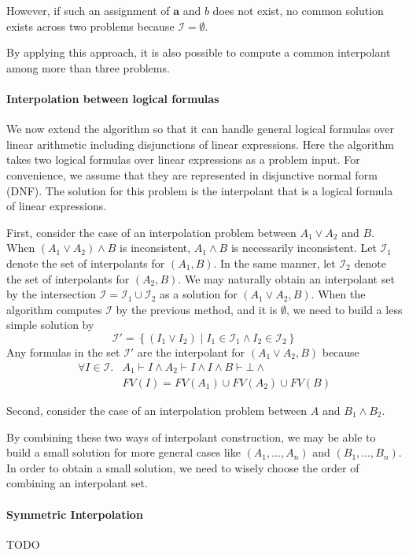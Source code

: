 However, if such an assignment of $\mathbf{a}$ and $b$ does not exist,
no common solution exists across two problems because $\mathcal{I} =
\emptyset$.

By applying this approach, it is also possible to compute a common
interpolant among more than three problems.


\paragraph{Interpolation between logical formulas}
We now extend the algorithm so that it can handle general logical
formulas over linear arithmetic including disjunctions of linear
expressions.  Here the algorithm takes two logical formulas over
linear expressions as a problem input.  For convenience, we assume
that they are represented in disjunctive normal form (DNF).  The
solution for this problem is the interpolant that is a logical formula
of linear expressions.

First, consider the case of an interpolation problem between $A_1 \vee
A_2$ and $B$.  When $(A_1 \vee A_2) \wedge B$ is inconsistent, $A_1
\wedge B$ is necessarily inconsistent.  Let $\mathcal{I}_1$ denote the
set of interpolants for $(A_1, B)$.  In the same manner, let
$\mathcal{I}_2$ denote the set of interpolants for $(A_2, B)$.  We may
naturally obtain an interpolant set by the intersection $\mathcal{I} =
\mathcal{I}_1 \cup \mathcal{I}_2$ as a solution for $(A_1 \vee A_2,
B)$.  When the algorithm computes $\mathcal{I}$ by the previous
method, and it is $\emptyset$, we need to build a less simple solution
by
\[ \mathcal{I}' = \left\lbrace \left( I_1 \vee I_2 \right) \mid
I_1 \in \mathcal{I}_1 \wedge I_2 \in \mathcal{I}_2 \right\rbrace \]
Any formulas in the set $\mathcal{I}'$ are the interpolant for $(A_1
\vee A_2, B)$ because
\begin{align*}
\forall I \in \mathcal{I}. & A_1 \vdash I \wedge A_2 \vdash I \wedge I \wedge B \vdash \bot \wedge \\
& FV(I) = FV(A_1) \cup FV(A_2) \cup FV(B)
\end{align*}

Second, consider the case of an interpolation problem between $A$ and
$B_1 \wedge B_2$.

By combining these two ways of interpolant construction, we may be
able to build a small solution for more general cases like $(A_1,
\ldots, A_n)$ and $(B_1, \ldots, B_n)$.  In order to obtain a small
solution, we need to wisely choose the order of combining an
interpolant set.

\paragraph{Symmetric Interpolation}
TODO
